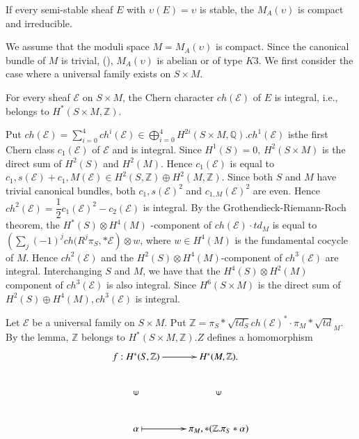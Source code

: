 \begin{cor}\label{cor4.6}
If every semi-stable sheaf $E$ with $\upsilon(E)=\upsilon$ is stable,
the $M_A(\upsilon)$ is compact and irreducible.
\end{cor}

We assume that the moduli space $M=M_A(\upsilon)$ is compact. Since
the canonical bundle of $M$ is trivial, (\cite[Corollary 0.2]{key12}),
$M_A(\upsilon)$ is abelian or of type $K3$. We first consider the case
where a universal family exists on $S\times M$. 

\begin{lemma}\label{lemma4.7}
For every sheaf $\mathscr{E}$ on $S\times M$, the Chern character
$ch(\mathscr{E})$ of $E$ is integral, i.e., belongs to
$H^{\ast}(S\times M,\mathbb{Z})$. 
\end{lemma}

\begin{Proof}
Put
$ch(\mathscr{E})=\sum\limits_{i=0}^{4}ch^{i}(\mathscr{E})\in \bigoplus\limits^{4}_{i=0}H^{2
i}(S\times M,\mathbb{Q}).ch^{1}(\mathscr{E})$ is\pageoriginale the first Chern class
$c_1(\mathscr{E})$ of $\mathscr{E}$ and is integral. Since
$H^{1}(S)=0$, $H^{2}(S\times M)$ is the direct sum of $H^{2}(S)$ and
$H^{2}(M)$. Hence $c_1(\mathscr{E})$ is equal to
$c_1,s(\mathscr{E})+c_1,M(\mathscr{E})\in H^{2}(S,\mathbb{Z})\oplus
H^{2}(M,\mathbb{Z})$. Since both $S$ and $M$ have trivial canonical
bundles, both $c_1,s\left(\mathscr{E}\right)^{2}$ and
$c_{1,M}\left(\mathscr{E}\right)^{2}$ are even. Hence
$ch^{2}(\mathscr{E})=\dfrac{1}{2}
c_1\left(\mathscr{E}\right)^{2}-c_2(\mathscr{E})$  is integral. By
the Grothendieck-Riemann-Roch theorem, the $H^{\ast}(S)\otimes
H^{4}(M)$ -component of $ch(\mathscr{E})\cdot t d_M$ is equal to
$\left(\sum\limits_{j}(-1)^{j}ch(R^{j}\pi_S,\ast\mathscr{E}\right)\otimes w$,
where $w \in H^{4}(M)$ is the fundamental cocycle  of $M$. Hence
$ch^{2}(\mathscr{E})$ and the $H^{2}(S)\otimes H^{4}(M)$-component of
$ch^{3}(\mathscr{E})$ are integral. Interchanging $S$ and $M$, we have
that the $H^{4}(S)\otimes H^{2}(M)$ component of $ch^{3}(\mathscr{E})$
is also integral. Since $H^{6}(S\times M)$ is the direct sum of
$H^{2}(S)\oplus H^{4}(M), ch^{3}(\mathscr{E})$ is integral.
\enprf
\end{Proof}

Let $\mathscr{E}$ be a universal family on $S\times M$. Put
$\mathbb{Z}=\pi_S\ast\sqrt{t d_S}
ch(\mathscr{E})^{\ast}\cdot \pi_M\ast\sqrt{td}_M$. By the lemma,
$\mathbb{Z}$ belongs to $H^{\ast}(S\times M,\mathbb{Z}).Z$ defines a
homomorphism
\setcounter{equation}{7}
\begin{equation}
\xymatrix{f:H^{\ast}(S,\mathbb{Z})\ar[r]& H^{\ast}(M,\mathbb{Z}).\\
\mbox{\rotatebox{90}{$\in$}} & \mbox{\rotatebox{90}{$\in$}}\\
\alpha\ar@{|->}[r]&\pi_M,\ast(\mathbb{Z}.\pi_S\ast \alpha)}
\end{equation}

